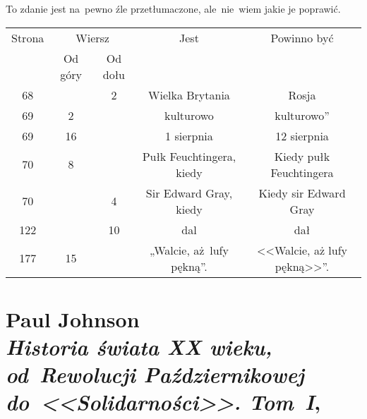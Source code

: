 \documentclass[a4paper,11pt]{article}
\numberwithin{equation}{section}
\begin{document}
\VerSpaceFour





\noindent
{} To zdanie jest na~pewno źle przetłumaczone,
ale~nie~wiem jakie je poprawić.






\newpage



\begin{center}

  \begin{tabular}{|c|c|c|c|c|}
    \hline
    Strona & \multicolumn{2}{c|}{Wiersz} & Jest
                              & Powinno być \\ \cline{2-3}
    & Od góry & Od dołu & & \\
    \hline
    68  & &  2 & Wielka Brytania & Rosja \\
    69  &  2 & & kulturowo & kulturowo'' \\
    69  & 16 & & 1 sierpnia & 12 sierpnia \\
    70  &  8 & & Pułk Feuchtingera, kiedy & Kiedy pułk Feuchtingera \\
    70  & &  4 & Sir Edward Gray, kiedy & Kiedy sir Edward Gray \\
    122 & & 10 & dal & dał \\
    177 & 15 & & „Walcie, aż~lufy pękną”. & <<Walcie, aż lufy pękną>>”. \\
    \hline
  \end{tabular}

\end{center}

\VerSpaceTwo













\newpage

\section{ %
  Paul Johnson \\
  \textit{Historia świata XX wieku, od~Rewolucji Październikowej} \\
  \textit{do~<<Solidarności>>. Tom~I},
  \cite{JohnsonHistoriaSwiataXXWiekuVolI2009}}
\end{document}
